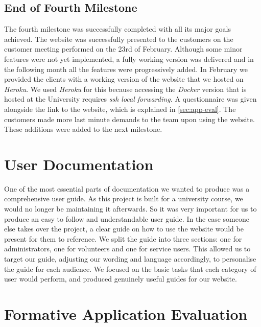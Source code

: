 \documentclass{l3proj}
\begin{document}
\subsection{End of Fourth Milestone}
\label{sec:milestone4}

The fourth milestone was successfully completed with all its major goals achieved. The website was successfully presented to the customers on the customer meeting performed on the 23rd of February. Although some minor features were not yet implemented, a fully working version was delivered and in the following month all the features were progressively added. In February we provided the clients with a working version of the website that we hosted on \textit{Heroku}. We used \textit{Heroku} for this because accessing the \textit{Docker} version that is hosted at the University requires \textit{ssh local forwarding.} A questionnaire was given alongside the link to the website, which is explained in \autoref{sec:app-eval}. The customers made more last minute demands to the team upon using the website. These additions were added to the next milestone.

\section{User Documentation}
\label{sec:user_doc}

One of the most essential parts of documentation we wanted to produce was a comprehensive user guide. As this project is built for a university course, we would no longer be maintaining it afterwards. So it was very important for us to produce an easy to follow and understandable user guide. In the case someone else takes over the project, a clear guide on how to use the website would be present for them to reference. We split the guide into three sections: one for administrators, one for volunteers and one for service users. This allowed us to target our guide, adjusting our wording and language accordingly, to personalise the guide for each audience. We focused on the basic tasks that each category of user would perform, and produced genuinely useful guides for our website.

\section{Formative Application Evaluation}
\label{sec:app-eval}
\end{document}
